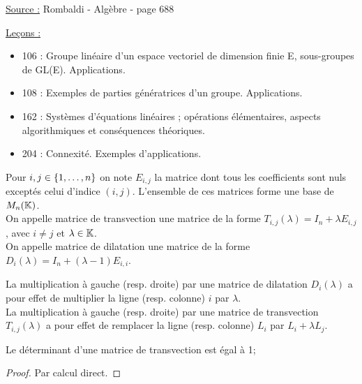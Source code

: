 
\newcommand{\Gln}{\text{GL}(n,\K)}
\newcommand{\Sln}{\text{SL}(n,\K)}

\pagestyle{fancy}

\fancyhead[C]{}
\fancyhead[R]{}



\underline{Source :} Rombaldi - Algèbre - page 688

\underline{Leçons :}
\begin{itemize}
\item 106 : Groupe linéaire d’un espace vectoriel de dimension finie E, sous-groupes de GL(E). Applications.
\item 108 : Exemples de parties génératrices d’un groupe. Applications.
\item 162 : Systèmes d’équations linéaires ; opérations élémentaires, aspects algorithmiques et conséquences théoriques.
\item 204 : Connexité. Exemples d’applications.
\end{itemize}

\begin{nota}
Pour $i,j \in \{ 1, \dots, n \}$ on note $E_{i,j}$ la matrice dont tous les coefficients sont nuls exceptés celui d'indice $(i,j)$.
L'ensemble de ces matrices forme une base de $M_{n}(\mathbb{K})$. \\
On appelle matrice de transvection une matrice de la forme 
$T_{i,j}(\lambda) = I_n + \lambda E_{i,j}$, avec $i \neq j$ et $\lambda \in \mathbb{K}$. \\
On appelle matrice de dilatation une matrice de la forme $D_i(\lambda) = I_n + (\lambda-1)E_{i,i}$.
\end{nota}

\begin{rmq}
La multiplication à gauche (resp. droite) par une matrice de dilatation $D_i(\lambda)$ a pour effet de multiplier la ligne (resp. colonne) $i$
par $\lambda$. \\
La multiplication à gauche (resp. droite) par une matrice de transvection $T_{i,j}(\lambda)$ a pour effet de remplacer la ligne 
(resp. colonne) $L_i$ par $L_i + \lambda L_j$.
\end{rmq}

\begin{lem}
\label{lem:1}
Le déterminant d'une matrice de transvection est égal à 1;
\end{lem}

\begin{proof}
Par calcul direct.
\end{proof}

